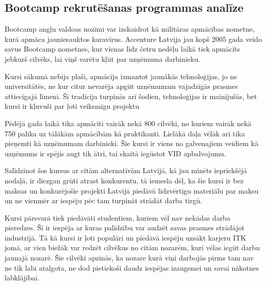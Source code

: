 \subsection{Bootcamp rekrutēšanas programmas analīze}
Bootcamp angļu valdoas nozīmi var izskaidrot kā militāras apmācības nometne, kurā apmāca jauniesauktos
karavīrus. Accenture Latvija jau kopš 2005 gada veido savus Bootcamp nometnes, kur vienas līdz četru 
nedēļu laikā tiek apmācīts jebkurš cilvēks, lai viņš varētu kļūt par uzņēmuma darbinieku.
\par
Kursi sākumā nebija plaši, apmācīja izmantot jaunākās tehnoloģijas, jo ne universitātēs, ne kur citur
nevarēja apgūt uzņēmumam vajadzīgās prasmes attiecīgajā līmenī. Šī tradīcija turpinās arī šodien,
tehnoloģijas ir mainījušās, bet kursi ir kļuvuši par ļoti veiksmīgu projektu
\par
Pēdējā gada laikā tika apmācīti vairāk nekā 800 cilvēki, no kuriem vairāk nekā 750 palika uz tālākām
apmācībām kā praktikanti. Lielākā daļa vēlāk arī tika pieņemti kā uzņēmumam darbinieki. Šie kursi ir
viens no galvenajiem veidiem kā uzņēmums ir spējis augt tik ātri, tai skaitā iegūstot VID apbalvojumu.
\par
Salīdzinot šos kursus ar citām alternatīvām Latvijā, kā jau minēts iepriekšējā nodaļā,
ir diezgan grūti atrast konkurentu, tā iemesla dēļ, ka šie kursi ir bez maksas un konkurējošie projekti
Latvijā piedāvā līdzvērtīgu materiālu par maksu un ne vienmēr ar iespēju pēc tam turpināt strādāt 
darba tirgū.
\par
Kursi pārsvarā tiek piedāvāti studentiem, kuriem vēl nav nekādas darba pieredzes. Šī ir iespēja
ar kuras palīdzību var audzēt savas prasmes strādājot industrijā. Tā kā kursi ir ļoti populāri un piedāvā
iespēju uzsākt karjeru ITK jomā, ar vien biežāk var redzēt cilvēkus no citām nozarēm, kuri vēlas iegūt
darbu jaunajā nozarē. Šie cilvēki apzinās, ka nozare kurā viņi darbojās pirms tam nav ne tik labi atalgota,
ne dod pietiekoši daudz iespējas izaugsmei un savai nākotnes labklājībai.
\par
